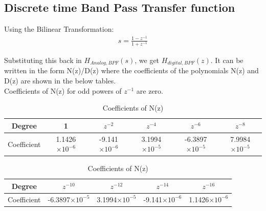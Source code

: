 \documentclass[12pt]{article}
\begin{document}
	\color{cyan}
	\subsection{Discrete time Band Pass Transfer function}
	\color{black}
	Using the Bilinear Transformation:
	\begin{gather*}
		s = \frac{1-z^{-1}}{1+z^{-1}}
	\end{gather*}
	
	\noindent Substituting this back in $H_{Analog,BPF}(s)$, we get $H_{digital,BPF}(z)$. It can be written in the form N(z)/D(z) where the coefficients of the polynomials N(z) and D(z) are shown in the below tables. \\Coefficients of N(z) for odd powers of $z^{-1}$ are zero. 
	
	\begin{table}[H]
		\begin{center}
			\begin{tabular}{ |c|c|c|c|c|c| } 
				\hline
				Degree & 1 & $z^{-2}$ & $z^{-4}$ & $z^{-6}$&$z^{-8}$\\ 
				\hline
				Coefficient & 1.1426$\times10^{-6}$ & -9.141$\times10^{-6}$ & 3.1994$\times10^{-5}$ & -6.3897$\times10^{-5}$ & 7.9984$\times10^{-5}$\\
				\hline
			\end{tabular}
		\end{center}
		\begin{center}
			\begin{tabular}{ |c|c|c|c|c| } 
				\hline
				Degree & $z^{-10}$ & $z^{-12}$ & $z^{-14}$&$z^{-16}$\\ 
				\hline
				Coefficient & -6.3897$\times10^{-5}$  &3.1994$\times10^{-5}$ & -9.141$\times10^{-6}$ &  1.1426$\times10^{-6}$ \\
				\hline
			\end{tabular}
		\end{center}
		
		\caption{Coefficients of N(z)}
		\label{Table 2: }	
		
	\end{table}
\end{document}
